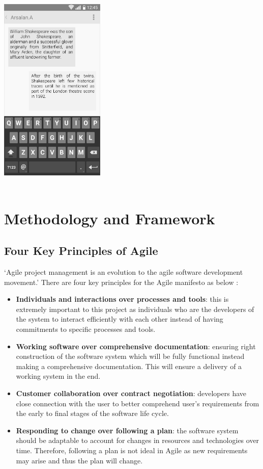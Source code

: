 \documentclass{article}
\begin{document}
\begin{appendices}
\begin{center}
\includegraphics[width=5cm, height=10cm]{Messages}
\end{center}

\newpage
\section{Methodology and Framework}
\subsection{Four Key Principles of Agile}
‘Agile project management is an evolution to the agile software development movement.’ There are four key principles for the Agile manifesto as below \cite{Agile-Scrum}: \par
\begin{itemize}
\item \textbf{Individuals and interactions over processes and tools}: this is extremely important to this project as individuals who are the developers of the system to interact efficiently with each other instead of having commitments to specific processes and tools. 
\item \textbf{Working software over comprehensive documentation}: ensuring right construction of the software system which will be fully functional instead making a comprehensive documentation. This will ensure a delivery of a working system in the end. 
\item \textbf{Customer collaboration over contract negotiation}: developers have close connection with the user to better comprehend user’s requirements from the early to final stages of the software life cycle. 
\item \textbf{Responding to change over following a plan}: the software system should be adaptable to account for changes in resources and technologies over time. Therefore, following a plan is not ideal in Agile as new requirements may arise and thus the plan will change. 
\end{itemize}


\end{appendices}
\end{document}
